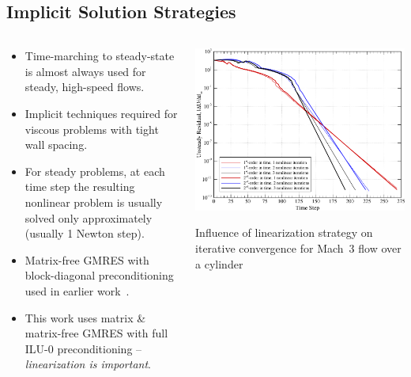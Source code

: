 \documentclass[compress,11pt]{beamer}
\begin{document}
\subsection{Implicit Solution Strategies}
\frame
{
  \vspace{-1.5em}
  \begin{columns}[t]
    \begin{block}{}
      \footnotesize
      \begin{itemize}
        \item Time-marching to steady-state is almost always used for steady, high-speed flows.
	\item Implicit techniques required for viscous problems with tight wall spacing. %
	\item For steady problems, at each time step the resulting nonlinear problem is usually solved only approximately (usually 1 Newton step).
	\item Matrix-free GMRES with block-diagonal preconditioning used in earlier work~\cite{skaliabadi_dissertation}.
	\item This work uses matrix \& matrix-free GMRES with full ILU-0 preconditioning -- \emph{linearization is important}.
      \end{itemize}
    \end{block}
      \tiny
      \begin{center}
	\includegraphics[width=\textwidth]{figures/time_convergence}

	Influence of linearization strategy on iterative convergence for Mach~3 flow over a cylinder
      \end{center}
  \end{columns}
}
\end{document}
